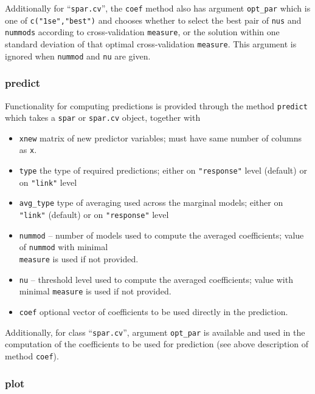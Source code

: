 \documentclass[
  article]{jss}
\begin{document}
Additionally for ``\texttt{spar.cv}'', the \texttt{coef} method also has
argument \texttt{opt\_par} which is one of \texttt{c("1se","best")} and
chooses whether to select the best pair of \texttt{nus} and
\texttt{nummods} according to cross-validation \texttt{measure}, or the
solution within one standard deviation of that optimal cross-validation
\texttt{measure}. This argument is ignored when \texttt{nummod} and
\texttt{nu} are given.

\subsubsection{predict}\label{predict}

Functionality for computing predictions is provided through the method
\texttt{predict} which takes a \texttt{spar} or \texttt{spar.cv} object,
together with

\begin{itemize}
\item
  \texttt{xnew} matrix of new predictor variables; must have same number
  of columns as \texttt{x}.
\item
  \texttt{type} the type of required predictions; either on
  \texttt{"response"} level (default) or on \texttt{"link"} level
\item
  \texttt{avg\_type} type of averaging used across the marginal models;
  either on \texttt{"link"} (default) or on \texttt{"response"} level
\item
  \texttt{nummod} -- number of models used to compute the averaged
  coefficients; value of \texttt{nummod} with minimal\\
  \texttt{measure} is used if not provided.
\item
  \texttt{nu} -- threshold level used to compute the averaged
  coefficients; value with minimal \texttt{measure} is used if not
  provided.
\item
  \texttt{coef} optional vector of coefficients to be used directly in
  the prediction.
\end{itemize}

Additionally, for class ``\texttt{spar.cv}'', argument \texttt{opt\_par}
is available and used in the computation of the coefficients to be used
for prediction (see above description of method \texttt{coef}).

\subsubsection{plot}\label{plot}
\end{document}

